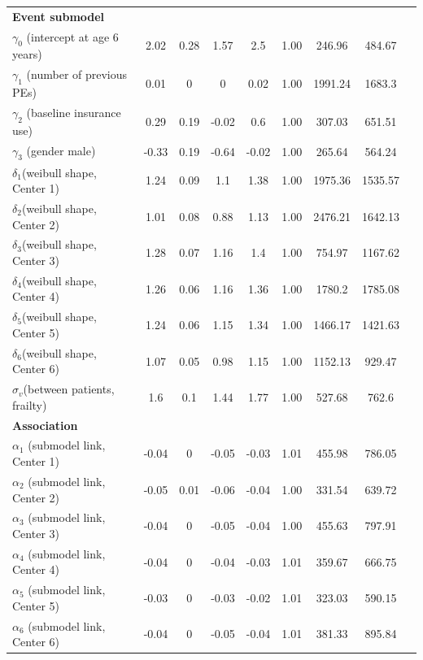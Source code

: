 \begin{table}[H]
\begin{threeparttable}
\begin{tabular}{lcccccccc}
     \rowcolor{Gainsboro!60}
  \bf Event submodel &&&&&&& \\
    $\gamma_0$ (intercept at age 6 years) & 2.02 & 0.28 & 1.57 & 2.5 & 1.00 &	246.96 & 484.67\\
    $\gamma_1$ (number of previous PEs) & 0.01 &	0 &	0 &	0.02 & 1.00 &	1991.24 & 1683.3\\
    $\gamma_2$ (baseline insurance use) & 0.29 & 0.19 &	-0.02 &	0.6 &	1.00 & 307.03 &	651.51\\
    $\gamma_3$ (gender\tnote{$\ast$}  male) & -0.33 & 0.19 & -0.64 & -0.02 & 1.00 &	265.64 & 564.24\\
    $\delta_1$(weibull shape, Center 1)  & 1.24 & 0.09 &	1.1 & 1.38 & 1.00 &	1975.36 & 1535.57\\
    $\delta_2$(weibull shape, Center 2)  & 1.01 & 0.08 &	0.88 & 1.13 & 1.00 & 2476.21 & 1642.13\\
    $\delta_3$(weibull shape, Center 3)  &1.28 &	0.07 & 1.16 & 1.4 &	1.00 & 754.97 &	1167.62\\
    $\delta_4$(weibull shape, Center 4)  & 1.26 & 0.06 &	1.16 & 1.36 & 1.00 & 1780.2 & 1785.08\\
    $\delta_5$(weibull shape, Center 5)  & 1.24 & 0.06 &	1.15 & 1.34 & 1.00 & 1466.17 & 1421.63\\
    $\delta_6$(weibull shape, Center 6)  & 1.07 & 0.05 &	0.98 & 1.15 & 1.00 & 1152.13 & 929.47\\
    $\sigma_v$(between patients, frailty)  & 1.6 &	0.1 & 1.44 & 1.77 &	1.00 & 527.68 &	762.6\\
     \rowcolor{Gainsboro!60}
 \bf Association &&&&&&& \\
    $\alpha_1$ (submodel link, Center 1) & -0.04 & 0 & -0.05 & -0.03 & 1.01 &	455.98 & 786.05\\
    $\alpha_2$ (submodel link, Center 2) & -0.05 & 0.01 &	-0.06 &	-0.04 &	1.00 & 331.54 &	639.72\\
    $\alpha_3$ (submodel link, Center 3) & -0.04 & 0 & -0.05 & -0.04 & 1.00 &	455.63 & 797.91\\
    $\alpha_4$ (submodel link, Center 4) & -0.04 & 0 & -0.04 & -0.03 & 1.01 &	359.67 & 666.75\\
    $\alpha_5$ (submodel link, Center 5) & -0.03 & 0 & -0.03 & -0.02 & 1.01 &	323.03 & 590.15\\
    $\alpha_6$ (submodel link, Center 6) & -0.04 & 0 & -0.05 & -0.04 & 1.01 &	381.33 & 895.84\\
    \bottomrule
  \end{tabular}
 \begin{tablenotes}[para]

\end{tablenotes}
\end{threeparttable}
\end{table}
